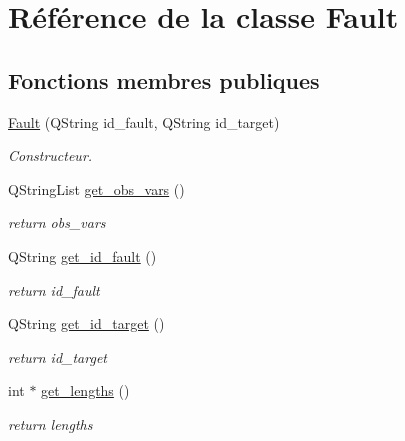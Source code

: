 \hypertarget{classFault}{
\section{Référence de la classe Fault}
\label{classFault}
}
\subsection*{Fonctions membres publiques}
\begin{DoxyCompactItemize}
\item 
\hyperlink{classFault_afa721f3f73d123711fd6fdf0c88de148}{Fault} (QString id\_\-fault, QString id\_\-target)
\begin{DoxyCompactList}\small\item\em Constructeur. \item\end{DoxyCompactList}\item 
QStringList \hyperlink{classFault_aad30675391b9f05cf15857dcbc8ab721}{get\_\-obs\_\-vars} ()
\begin{DoxyCompactList}\small\item\em return obs\_\-vars \item\end{DoxyCompactList}\item 
QString \hyperlink{classFault_a00cbe6276e5332ed8ec8f878e0a66731}{get\_\-id\_\-fault} ()
\begin{DoxyCompactList}\small\item\em return id\_\-fault \item\end{DoxyCompactList}\item 
QString \hyperlink{classFault_ac95f44eecf0fc1df45155571f6537a67}{get\_\-id\_\-target} ()
\begin{DoxyCompactList}\small\item\em return id\_\-target \item\end{DoxyCompactList}\item 
int $\ast$ \hyperlink{classFault_adfb3adf4ffb686acf6e093b8bebffb53}{get\_\-lengths} ()
\begin{DoxyCompactList}\small\item\em return lengths \item\end{DoxyCompactList}\end{DoxyCompactItemize}


